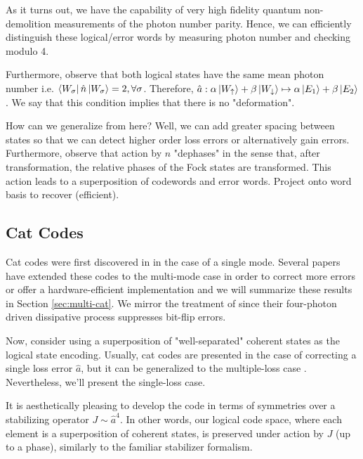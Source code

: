 \documentclass[12]{amsart}
\newcommand\0{\mathbf{0}}
\newcommand\<{\langle}
\renewcommand\>{\rangle}
\begin{document}
As it turns out, we have the capability of very high fidelity quantum non-demolition measurements of the photon number parity. Hence, we can efficiently distinguish these logical/error words by measuring photon number and checking modulo 4. 

Furthermore, observe that both logical states have the same mean photon number i.e. $\bra{W_\sigma} \hat{n} \ket{W_\sigma} = 2, \forall \sigma$. Therefore, $\hat{a} : \alpha\ket{W_\uparrow} + \beta\ket{W_\downarrow} \mapsto \alpha \ket{E_1} + \beta \ket{E_2}$. We say that this condition implies that there is no "deformation".

How can we generalize from here? Well, we can add greater spacing between states so that we can detect higher order loss errors or alternatively gain errors. Furthermore, observe that action by $n$ "dephases" in the sense that, after transformation, the relative phases of the Fock states are transformed. This action leads to a superposition of codewords and error words. Project onto word basis to recover (efficient).

\subsection{Cat Codes}

Cat codes were first discovered in \cite{cochrane1999macroscopically} in the case of a single mode. Several papers have extended these codes to the multi-mode case in order to correct more errors or offer a hardware-efficient implementation \cite{albert2018multimode, leghtas2013hardware, mirrahimi2014dynamically} and we will summarize these results in Section \ref{sec:multi-cat}. We mirror the treatment of \cite{mirrahimi2014dynamically} since their four-photon driven dissipative process suppresses bit-flip errors.

Now, consider using a superposition of "well-separated" coherent states as the logical state encoding. Usually, cat codes are presented in the case of correcting a single loss error $\hat{a}$, but it can be generalized to the multiple-loss case \cite{albert2018multimode}. Nevertheless, we'll present the single-loss case.

It is aesthetically pleasing to develop the code in terms of symmetries over a stabilizing operator $J \sim \hat{a}^4$. In other words, our logical code space, where each element is a superposition of coherent states, is preserved under action by $J$ (up to a phase), similarly to the familiar stabilizer formalism.
\end{document}
